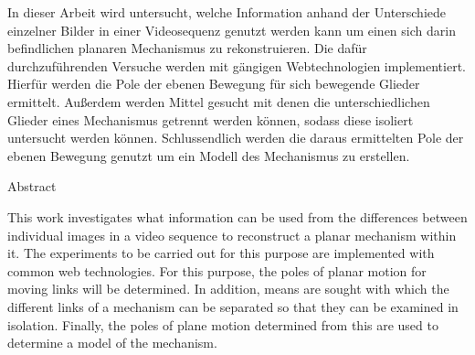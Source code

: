 %
\label{sec:abstract}

In dieser Arbeit wird untersucht, welche Information anhand der Unterschiede einzelner Bilder in einer Videosequenz genutzt werden kann um einen sich darin befindlichen planaren Mechanismus zu rekonstruieren.
Die dafür durchzuführenden Versuche werden mit gängigen Webtechnologien implementiert.
Hierfür werden die Pole der ebenen Bewegung für sich bewegende Glieder ermittelt.
Au{\ss}erdem werden Mittel gesucht mit denen die unterschiedlichen Glieder eines Mechanismus getrennt werden können, sodass diese isoliert untersucht werden können.
Schlussendlich werden die daraus ermittelten Pole der ebenen Bewegung genutzt um ein Modell des Mechanismus zu erstellen.

\vspace*{20mm}

{Abstract}
\label{sec:abstract-diff}

This work investigates what information can be used from the differences between individual images in a video sequence to reconstruct a planar mechanism within it.
The experiments to be carried out for this purpose are implemented with common web technologies.
For this purpose, the poles of planar motion for moving links will be determined.
In addition, means are sought with which the different links of a mechanism can be separated so that they can be examined in isolation.
Finally, the poles of plane motion determined from this are used to determine a model of the mechanism.
